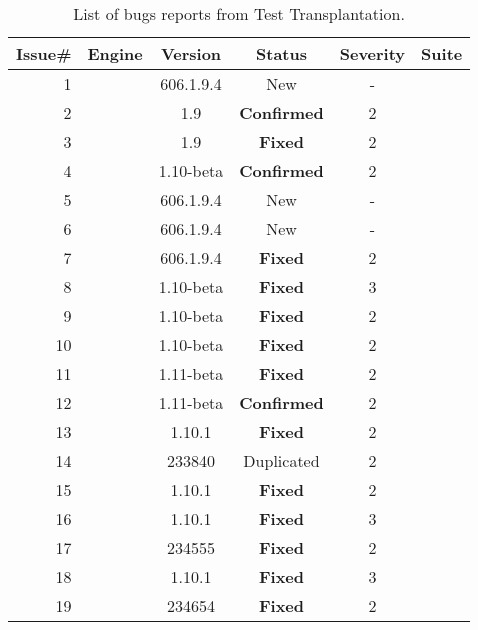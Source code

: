 \begin{table}[t!]
  \renewcommand{\arraystretch}{0.35}
      \centering
      \caption{List of bugs reports from Test Transplantation.}
      \label{tab:test-transplantation-bugs}

      \begin{tabular}{rccccc}

        \toprule Issue\# & Engine  & Version & Status & Severity & Suite \\
        \midrule
       1  & \jsc{} & 606.1.9.4 & New  & - & \jerry{} \\
       2  & \chakra{}  & 1.9 & \textbf{Confirmed} & 2 & \smonkey{} \\
       3  & \chakra{}  & 1.9 & \textbf{Fixed}   & 2 & \smonkey{} \\
       4  & \chakra{} & 1.10-beta & \textbf{Confirmed} & 2 & \smonkey{} \\
       5  & \jsc{} & 606.1.9.4 & New &  -  & \smonkey{}\\
       6  & \jsc{} & 606.1.9.4 & New & - & \smonkey{} \\
       7  & \jsc{} & 606.1.9.4 & \textbf{Fixed} & 2 & \smonkey{}\\ %
       8  & \chakra{} & 1.10-beta & \textbf{Fixed} & 3 & \smonkey{}\\
       9  & \chakra{} & 1.10-beta & \textbf{Fixed} & 2 & \jsc{}\\
       10 & \chakra{} & 1.10-beta & \textbf{Fixed} & 2 & \smonkey{}\\
       11 & \chakra{} & 1.11-beta & \textbf{Fixed} & 2 & \jsc{}\\
       12 & \chakra{} & 1.11-beta & \textbf{Confirmed} & 2 & \jerry{}\\ %
       13 & \chakra{} & 1.10.1 & \textbf{Fixed} & 2 & \smonkey{}\\
       14 & \jsc{} & 233840 & Duplicated & 2 & \jerry{}\\
       15 & \chakra{} & 1.10.1 & \textbf{Fixed} & 2 & \jerry{}\\ %
       16 & \chakra{} & 1.10.1 & \textbf{Fixed} & 3 & \jerry{}\\
       17 & \jsc{} & 234555 &\textbf{Fixed} & 2 & \jerry{}\\
       18 & \chakra{} & 1.10.1 & \textbf{Fixed} & 3 & \jerry{}\\
       19 & \jsc{} & 234654 & \textbf{Fixed} & 2 & \jerry{}\\

\end{tabular}
\end{table}
